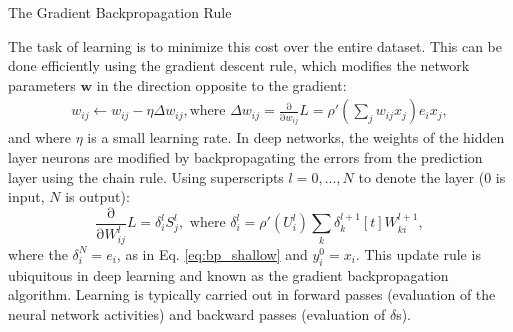 \documentclass[journal,onecolumn,11pt]{IEEEtran}
\begin{document}
\begin{infobox}
  \begin{mdframed}[backgroundcolor=black!10]\small
    \caption{\label{box:bp} The Gradient Backpropagation Rule} The task of learning is to minimize this cost over the entire dataset.
    This can be done efficiently using the gradient descent rule, which modifies the network parameters $\mathbf{w}$ in the direction opposite to the gradient:
    \begin{equation}\label{eq:bp_shallow}
      \begin{split}
        w_{ij} \leftarrow w_{ij} - \eta \Delta w_{ij},  \text{where } \Delta w_{ij} = \frac{\mathrm{\partial}}{\mathrm{\partial} w_{ij}} L = \rho'\left(\sum_j w_{ij} x_j\right) e_i x_j,
      \end{split}
    \end{equation}
    and where $\eta$ is a small learning rate. 
    In deep networks, the weights of the hidden layer neurons are modified by backpropagating the errors from the prediction layer using the chain rule. 
    Using superscripts $l=0,...,N$ to denote the layer ($0$ is input, $N$ is output):
    \begin{equation}\label{eq:bp_deep}
      \frac{\mathrm{\partial}}{\mathrm{\partial} W^{l}_{ij}} L = \delta_{i}^{l}  S^{l}_j,\text{ where }\delta_{i}^{l} = \rho'\left( U_i^l \right) \sum_k \delta_{k}^{l+1}[t] W_{ki}^{l+1},
    \end{equation}
    where the $\delta_{i}^N=e_i$, as in Eq. \ref{eq:bp_shallow} and $y_{i}^0=x_i$.
    This update rule is ubiquitous in deep learning \cite{Rumelhart_etal88_paradist} and known as the gradient backpropagation algorithm.   
    Learning is typically carried out in forward passes (evaluation of the neural network activities) and backward passes (evaluation of $\delta$s).
  \end{mdframed}
\end{infobox}
\end{document}
